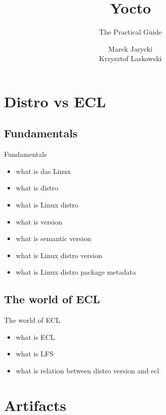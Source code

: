 \documentclass{beamer}
\title[Yocto: The Practical Guide]{Yocto}
\subtitle{The Practical Guide}
\author[M. Jarycki, K. Laskowski]{
    Marek Jarycki \\
    Krzysztof Laskowski
}
\begin{document}
\begin{frame}
    \titlepage
\end{frame}

\begin{frame}
    \tableofcontents
\end{frame}

\section{Distro vs ECL}

\subsection{Fundamentals}

\begin{frame}{Fundamentals}
    \begin{itemize}
        \item what is das Linux
        \item what is distro
        \item what is Linux distro
        \item what is version
        \item what is semantic version
        \item what is Linux distro version
        \item what is Linux distro package metadata
    \end{itemize}
\end{frame}

\subsection{The world of ECL}

\begin{frame}{The world of ECL}
    \begin{itemize}
        \item what is ECL
        \item what is LFS
        \item what is relation between distro version and ecl
    \end{itemize}
\end{frame}

\section{Artifacts}
\end{document}
